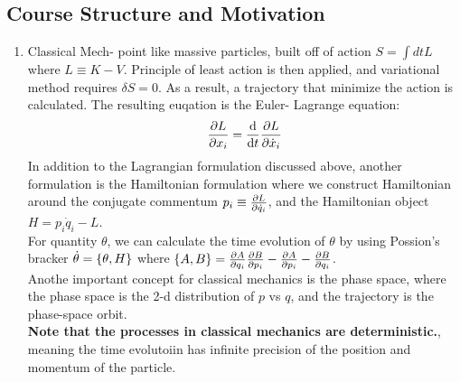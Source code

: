 \documentclass{article}
\begin{document}
\subsection*{Course Structure and Motivation}
\begin{enumerate}
 \item Classical Mech- point like massive particles, built off of action $S = \int dt L $ where $L \equiv K -V$. Principle of least action is then applied, and variational method requires $\delta S = 0$. As a result, a trajectory that minimize the action is calculated. The resulting euqation is the Euler- Lagrange equation:
\begin{equation*}
  \pdv{L}{x_i} = \dv{t} \pdv{L}{\dot{x}_i}
\end{equation*}
In addition to the Lagrangian formulation discussed above, another formulation is the Hamiltonian formulation where we construct Hamiltonian around the conjugate commentum $p_i \equiv \pdv{L}{\dot{q}_i}$, and the Hamiltonian object $H = p_i\dot{q}_i -L$.  \\ 
For quantity $\theta$, we can calculate the time evolution of $\theta $ by using Possion's bracker $\dot{\theta}= \qty{\theta ,H}$ where $\qty{A,B}= \pdv{A}{q_i}\pdv{B}{p_i}- \pdv{A}{p_i}- \pdv{B}{q_i}$. \\ 
Anothe important concept for classical mechanics is the phase space, where the phase space is the 2-d distribution of $p $ vs $q$, and the trajectory is the phase-space orbit. \\ 
\textbf{Note that the processes in classical mechanics are deterministic.}, meaning the time evolutoiin has infinite precision of the position and momentum of the particle.


\end{enumerate}
\end{document}

